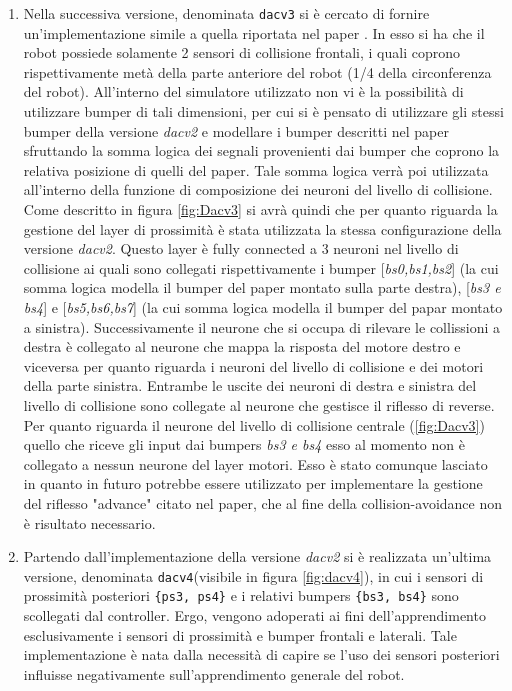 \begin{enumerate}
    \item Nella successiva versione, denominata \texttt{dacv3} si è cercato di fornire un'implementazione simile a quella riportata nel paper \cite{verschure1992distributed}.
    In esso si ha che il robot possiede solamente 2 sensori di collisione frontali, i quali coprono rispettivamente metà della parte anteriore del robot (1/4 della circonferenza del robot). All'interno del simulatore utilizzato non vi è la possibilità di utilizzare bumper di tali dimensioni, per cui si è pensato di utilizzare gli stessi bumper della versione \textit{dacv2} e modellare i bumper descritti nel paper sfruttando la somma logica dei segnali provenienti dai bumper che coprono la relativa posizione di quelli del paper. Tale somma logica verrà poi utilizzata all'interno della funzione di composizione dei neuroni del livello di collisione.
    Come descritto in figura \ref{fig:Dacv3} si avrà quindi che per quanto riguarda la gestione del layer di prossimità è stata utilizzata la stessa configurazione della versione \textit{dacv2}. Questo layer è fully connected a 3 neuroni nel livello di collisione ai quali sono collegati rispettivamente i bumper [\textit{bs0,bs1,bs2}] (la cui somma logica modella il bumper del paper montato sulla parte destra), [\textit{bs3 e bs4}] e [\textit{bs5,bs6,bs7}] (la cui somma logica modella il bumper del papar montato a sinistra). Successivamente il neurone che si occupa di rilevare le collissioni a destra è collegato al neurone che mappa la risposta del motore destro e viceversa per quanto riguarda i neuroni del livello di collisione e dei motori della parte sinistra. Entrambe le uscite dei neuroni di destra e sinistra del livello di collisione sono collegate al neurone che gestisce il riflesso di reverse. Per quanto riguarda il neurone del livello di collisione centrale (\ref{fig:Dacv3}) quello che riceve gli input dai bumpers \textit{bs3 e bs4} esso al momento non è collegato a nessun neurone del layer motori. Esso è stato comunque lasciato in quanto in futuro potrebbe essere utilizzato per implementare la gestione del riflesso "advance" citato nel paper, che al fine della collision-avoidance non è risultato necessario.
    
    \item Partendo dall'implementazione della versione \textit{dacv2} si è realizzata un'ultima versione, denominata \texttt{dacv4}(visibile in figura \ref{fig:dacv4}),  in cui i sensori di prossimità posteriori \texttt{\{ps3, ps4\}} e i relativi bumpers \texttt{\{bs3, bs4\}} sono scollegati dal controller. Ergo, vengono adoperati ai fini dell'apprendimento esclusivamente i sensori di prossimità e bumper frontali e laterali. Tale implementazione è nata dalla necessità di capire se l'uso dei sensori posteriori influisse negativamente sull'apprendimento generale del robot.
    
\end{enumerate}

